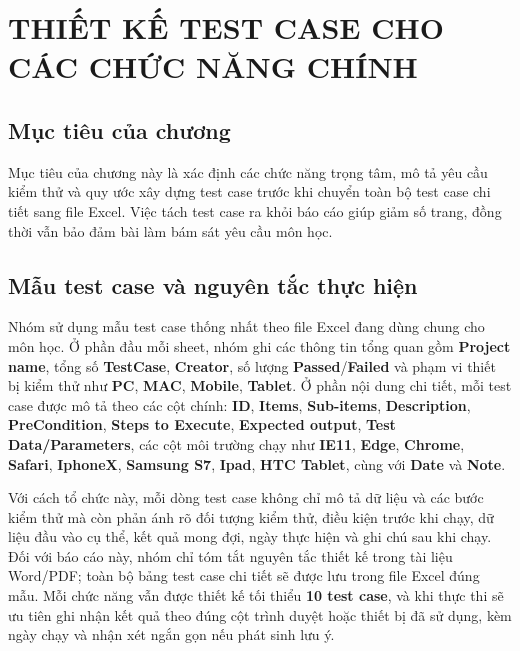 
\section{\textbf{THIẾT KẾ TEST CASE CHO CÁC CHỨC NĂNG CHÍNH}}

\subsection{Mục tiêu của chương}
Mục tiêu của chương này là xác định các chức năng trọng tâm, mô tả yêu cầu kiểm thử và quy ước xây dựng test case trước khi chuyển toàn bộ test case chi tiết sang file Excel. Việc tách test case ra khỏi báo cáo giúp giảm số trang, đồng thời vẫn bảo đảm bài làm bám sát yêu cầu môn học.

\subsection{Mẫu test case và nguyên tắc thực hiện}
Nhóm sử dụng mẫu test case thống nhất theo file Excel đang dùng chung cho môn học. Ở phần đầu mỗi sheet, nhóm ghi các thông tin tổng quan gồm \textbf{Project name}, tổng số \textbf{TestCase}, \textbf{Creator}, số lượng \textbf{Passed}/\textbf{Failed} và phạm vi thiết bị kiểm thử như \textbf{PC}, \textbf{MAC}, \textbf{Mobile}, \textbf{Tablet}. Ở phần nội dung chi tiết, mỗi test case được mô tả theo các cột chính: \textbf{ID}, \textbf{Items}, \textbf{Sub-items}, \textbf{Description}, \textbf{PreCondition}, \textbf{Steps to Execute}, \textbf{Expected output}, \textbf{Test Data/Parameters}, các cột môi trường chạy như \textbf{IE11}, \textbf{Edge}, \textbf{Chrome}, \textbf{Safari}, \textbf{IphoneX}, \textbf{Samsung S7}, \textbf{Ipad}, \textbf{HTC Tablet}, cùng với \textbf{Date} và \textbf{Note}.

Với cách tổ chức này, mỗi dòng test case không chỉ mô tả dữ liệu và các bước kiểm thử mà còn phản ánh rõ đối tượng kiểm thử, điều kiện trước khi chạy, dữ liệu đầu vào cụ thể, kết quả mong đợi, ngày thực hiện và ghi chú sau khi chạy. Đối với báo cáo này, nhóm chỉ tóm tắt nguyên tắc thiết kế trong tài liệu Word/PDF; toàn bộ bảng test case chi tiết sẽ được lưu trong file Excel đúng mẫu. Mỗi chức năng vẫn được thiết kế tối thiểu \textbf{10 test case}, và khi thực thi sẽ ưu tiên ghi nhận kết quả theo đúng cột trình duyệt hoặc thiết bị đã sử dụng, kèm ngày chạy và nhận xét ngắn gọn nếu phát sinh lưu ý.

